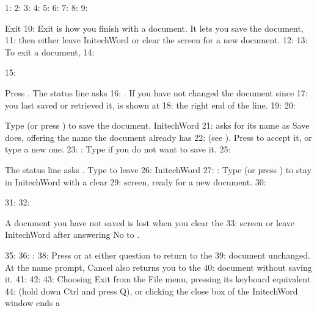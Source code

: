 1: %
2: %
3: %
4: %
5: %
6: %
7: %
8: 
9: \begin{Feature}{Exit}
10: Exit is how you finish with a document.  It lets you save the document,
11: then either leave InitechWord or clear the screen for a new document.
12: 
13: To exit a document,
14: \begin{WPSteps}
15: \item Press .  The status line asks
16: .  If you have not changed the document since
17: you last saved or retrieved it,  is shown at
18: the right end of the line.
19: 
20: \item Type  (or press ) to save the document.  InitechWord
21: asks for its name as Save does, offering the name the document already has
22: (see ).  Press  to accept it, or type a new one.
23: : Type  if you do not want to save it.
25: \item The status line asks .  Type  to leave
26: InitechWord
27: : Type  (or press ) to stay in InitechWord with a clear
29: screen, ready for a new document.
30: \end{WPSteps}
31: 
32: \begin{Important}A document you have not saved is lost when you clear the
33: screen or leave InitechWord after answering No to .\end{Important}
35: 
36: : 
38: Press  or  at either question to return to the
39: document unchanged.  At the name prompt, Cancel also returns you to the
40: document without saving it.
41: 
42: 
43: Choosing Exit from the File menu, pressing its keyboard equivalent
44: (hold down Ctrl and press Q), or clicking the close box of the InitechWord window ends a

\end{Feature}
